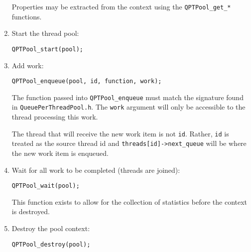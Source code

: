 \begin{enumerate}
  Properties may be extracted from the context using the
  \texttt{QPTPool\_get\_*} functions.

\item Start the thread pool:

  \texttt{QPTPool\_start(pool);}

\item Add work:

  \texttt{QPTPool\_enqueue(pool, id, function, work);}

  The function passed into \texttt{QPTPool\_enqueue} must match the
  signature found in \texttt{QueuePerThreadPool.h}. The \texttt{work} argument
  will only be accessible to the thread processing this work.

  The thread that will receive the new work item is not \texttt{id}.
  Rather, \texttt{id} is treated as the source thread id and
  \texttt{threads[id]->next\_queue} will be where the new work item is
  enqueued.

\item Wait for all work to be completed (threads are joined):

  \texttt{QPTPool\_wait(pool);}

  This function exists to allow for the collection of statistics
  before the context is destroyed.

\item Destroy the pool context:

  \texttt{QPTPool\_destroy(pool);}
\end{enumerate}
